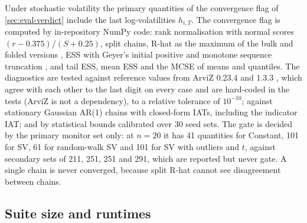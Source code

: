 Under stochastic volatility the primary quantities of the convergence flag of
\cref{sec:eval-verdict} include the last log-volatilities $h_{i,T}$.
The convergence flag is computed by in-repository NumPy code: rank normalisation with normal scores
$(r - 0.375)/(S + 0.25)$, split chains, R-hat as the maximum of the bulk and folded versions
\citep{vehtari2021rank}, ESS with Geyer's initial positive and monotone sequence truncation
\citep{geyer1992practical}, and tail ESS, mean ESS and the MCSE of means and quantiles.
The diagnostics are tested against reference values from ArviZ 0.23.4 and  1.3.3
\citep{kumar2019arviz}, which agree with each other to the last digit on every case and are
hard-coded in the tests (ArviZ is not a dependency), to a relative tolerance of $10^{-10}$; against
stationary Gaussian AR(1) chains with closed-form IATs, including the indicator IAT; and by
statistical bounds calibrated over 30 seed sets.
The gate is decided by the primary monitor set only: at $n = 20$ it has 41 quantities for Constant,
101 for SV, 61 for random-walk SV and 101 for SV with outliers and $t$, against secondary sets of
211, 251, 251 and 291, which are reported but never gate.
A single chain is never converged, because split R-hat cannot see disagreement between chains.

\subsection{Suite size and runtimes}\label{app:runtimes}

